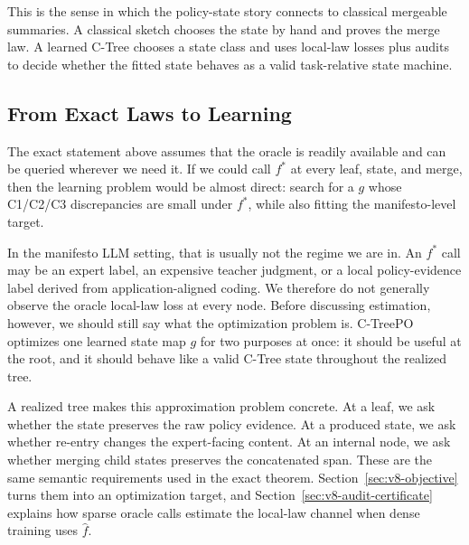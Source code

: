 This is the sense in which the policy-state story connects to classical
mergeable summaries. A classical sketch chooses the state by hand and proves
the merge law. A learned C-Tree chooses a state class and uses local-law losses
plus audits to decide whether the fitted state behaves as a valid
task-relative state machine.

\subsection{From Exact Laws to Learning}

The exact statement above assumes that the oracle is readily available and can
be queried wherever we need it. If we could call \(f^\ast\) at every leaf,
state, and merge, then the learning problem would be almost direct: search for
a \(g\) whose C1/C2/C3 discrepancies are small under \(f^\ast\), while also
fitting the manifesto-level target.

In the manifesto LLM setting, that is usually not the regime we are in. An
\(f^\ast\) call may be an expert label, an expensive teacher judgment, or a
local policy-evidence label derived from application-aligned coding. We
therefore do not generally observe the oracle local-law loss at every node.
Before discussing estimation, however, we should still say what the
optimization problem is. C-TreePO optimizes one learned state map \(g\) for
two purposes at once: it should be useful at the root, and it should behave
like a valid C-Tree state throughout the realized tree.

A realized tree makes this approximation problem concrete. At a leaf, we ask
whether the state preserves the raw policy evidence. At a produced state, we
ask whether re-entry changes the expert-facing content. At an internal node,
we ask whether merging child states preserves the concatenated span. These are
the same semantic requirements used in the exact theorem.
Section~\ref{sec:v8-objective} turns them into an optimization target, and
Section~\ref{sec:v8-audit-certificate} explains how sparse oracle calls
estimate the local-law channel when dense training uses \(\widehat f\).
